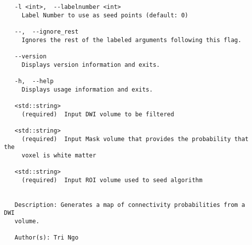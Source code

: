 \begin{verbatim}
   -l <int>,  --labelnumber <int>
     Label Number to use as seed points (default: 0)

   --,  --ignore_rest
     Ignores the rest of the labeled arguments following this flag.

   --version
     Displays version information and exits.

   -h,  --help
     Displays usage information and exits.

   <std::string>
     (required)  Input DWI volume to be filtered

   <std::string>
     (required)  Input Mask volume that provides the probability that the
     voxel is white matter

   <std::string>
     (required)  Input ROI volume used to seed algorithm


   Description: Generates a map of connectivity probabilities from a DWI
   volume.

   Author(s): Tri Ngo
\end{verbatim}
